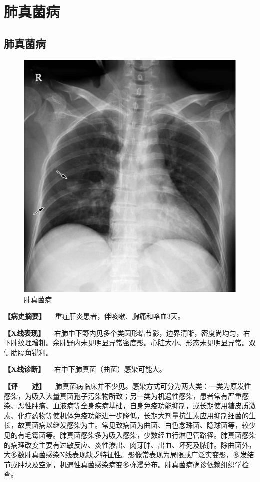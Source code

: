 \section{肺真菌病}

\subsection{肺真菌病}

\begin{figure}[!htbp]
 \centering
 \includegraphics{./images/Image00161.jpg}
 \captionsetup{justification=centering}
 \caption{肺真菌病}
 \label{fig3-6-1}
  \end{figure} 

\textbf{【病史摘要】} 　重症肝炎患者，伴咳嗽、胸痛和咯血3天。

\textbf{【X线表现】}
　右肺中下野内见多个类圆形结节影，边界清晰，密度尚均匀，右下肺纹理增粗。余肺野内未见明显异常密度影。心脏大小、形态未见明显异常。双侧肋膈角锐利。

\textbf{【X线诊断】} 　右中下肺真菌（曲菌）感染可能大。

\textbf{【评　　述】}
　肺真菌病临床并不少见。感染方式可分为两大类：一类为原发性感染，为吸入大量真菌孢子污染物所致；另一类为机遇性感染，患者常有严重感染、恶性肿瘤、血液病等全身疾病基础，自身免疫功能抑制，或长期使用糖皮质激素、化疗药物等使机体免疫功能进一步降低，长期大剂量抗生素应用抑制细菌的生长，故真菌病以继发感染为主。常见致病菌为曲菌、白色念珠菌、隐球菌等，较少见的有毛霉菌等。肺真菌感染多为吸入感染，少数经血行淋巴管路径。肺真菌感染的病理改变主要有过敏反应、炎性渗出、肉芽肿、出血、坏死及脓肿。除曲菌外，大多数肺真菌感染X线表现缺乏特征性。影像常表现为局限或广泛实变影，多发结节或肿块及空洞，机遇性真菌感染病变多弥漫分布。肺真菌病确诊依赖组织学检查。

